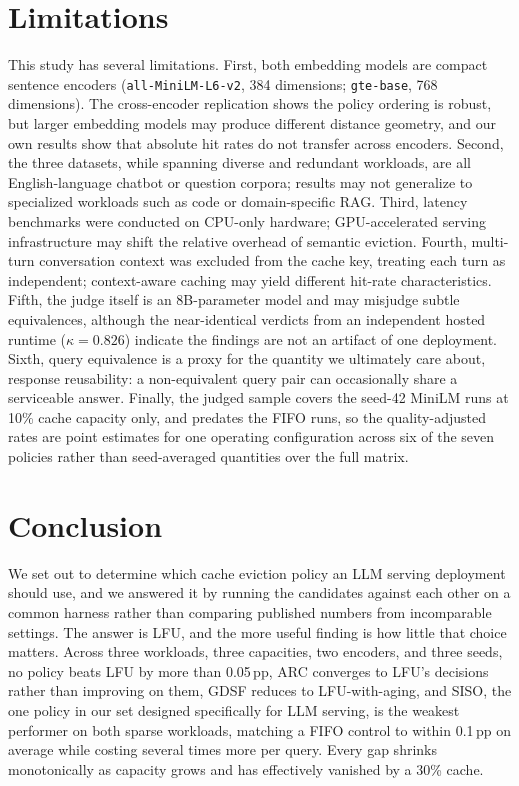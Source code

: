 \documentclass[sigconf,nonacm]{acmart}
\begin{document}
\section{Limitations}

This study has several limitations. First, both embedding models are compact sentence encoders (\texttt{all-MiniLM-L6-v2}, 384 dimensions; \texttt{gte-base}, 768 dimensions). The cross-encoder replication shows the policy ordering is robust, but larger embedding models may produce different distance geometry, and our own results show that absolute hit rates do not transfer across encoders. Second, the three datasets, while spanning diverse and redundant workloads, are all English-language chatbot or question corpora; results may not generalize to specialized workloads such as code or domain-specific RAG. Third, latency benchmarks were conducted on CPU-only hardware; GPU-accelerated serving infrastructure may shift the relative overhead of semantic eviction. Fourth, multi-turn conversation context was excluded from the cache key, treating each turn as independent; context-aware caching \cite{yan2025contextcache} may yield different hit-rate characteristics. Fifth, the judge itself is an 8B-parameter model and may misjudge subtle equivalences, although the near-identical verdicts from an independent hosted runtime ($\kappa = 0.826$) indicate the findings are not an artifact of one deployment. Sixth, query equivalence is a proxy for the quantity we ultimately care about, response reusability: a non-equivalent query pair can occasionally share a serviceable answer. Finally, the judged sample covers the seed-42 MiniLM runs at 10\% cache capacity only, and predates the FIFO runs, so the quality-adjusted rates are point estimates for one operating configuration across six of the seven policies rather than seed-averaged quantities over the full matrix.

\section{Conclusion}
We set out to determine which cache eviction policy an LLM serving deployment should use, and we answered it by running the candidates against each other on a common harness rather than comparing published numbers from incomparable settings. The answer is LFU, and the more useful finding is how little that choice matters. Across three workloads, three capacities, two encoders, and three seeds, no policy beats LFU by more than 0.05\,pp, ARC converges to LFU's decisions rather than improving on them, GDSF reduces to LFU-with-aging, and SISO, the one policy in our set designed specifically for LLM serving, is the weakest performer on both sparse workloads, matching a FIFO control to within 0.1\,pp on average while costing several times more per query. Every gap shrinks monotonically as capacity grows and has effectively vanished by a 30\% cache.
\end{document}
